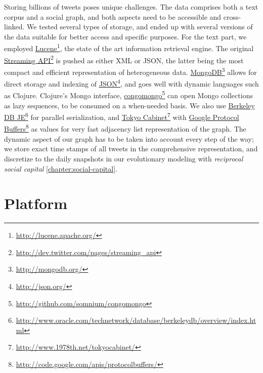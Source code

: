 \documentclass[10pt,oneside]{memoir}
\begin{document}
\begin{Spacing}{2}
Storing billions of tweets poses unique challenges.  The data comprises both a text corpus and a social graph, and both aspects need to be accessible and cross-linked.  We tested several types of storage, and ended up with several versions of the data suitable for better access and specific purposes.  For the text part, we employed \href{http://lucene.apache.org/}{Lucene}\footnote{\href{http://lucene.apache.org/}{http://lucene.apache.org/}}, the state of the art information retrieval engine.  The original \href{http://dev.twitter.com/pages/streaming_api}{Streaming API}\footnote{\href{http://dev.twitter.com/pages/streaming_api}{http://dev.twitter.com/pages/streaming\_api}} is pushed as either XML or JSON, the latter being the most compact and efficient representation of heterogeneous data.  \href{http://mongodb.org/}{MongoDB}\footnote{\href{http://mongodb.org/}{http://mongodb.org/}} allows for direct storage and indexing of \href{http://json.org/}{JSON}\footnote{\href{http://json.org/}{http://json.org/}}, and goes well with dynamic languages such as Clojure.  Clojure's Mongo interface, \href{http://github.com/somnium/congomongo}{congomongo}\footnote{\href{http://github.com/somnium/congomongo}{http://github.com/somnium/congomongo}} can open Mongo collections as lazy sequences, to be consumed on a when-needed basis.  We also use \href{http://www.oracle.com/technetwork/database/berkeleydb/overview/index.html}{Berkeley DB JE}\footnote{\href{http://www.oracle.com/technetwork/database/berkeleydb/overview/index.html}{http://www.oracle.com/technetwork/database/berkeleydb/overview/index.html}} for parallel serialization, and \href{http://www.1978th.net/tokyocabinet/}{Tokyo Cabinet}\footnote{\href{http://www.1978th.net/tokyocabinet/}{http://www.1978th.net/tokyocabinet/}} with \href{http://code.google.com/apis/protocolbuffers/}{Google Protocol Buffers}\footnote{\href{http://code.google.com/apis/protocolbuffers/}{http://code.google.com/apis/protocolbuffers/}} as values for very fast adjacency list representation of the graph.  The dynamic aspect of our graph has to be taken into account every step of the way; we store exact time stamps of all tweets in the comprehensive representation, and discretize to the daily snapshots in our evolutionary modeling with {\itshape reciprocal social capital} \ref{chapter:social-capital}.


\pagebreak \section{Platform}
\label{platform}


\end{Spacing}
\end{document}
